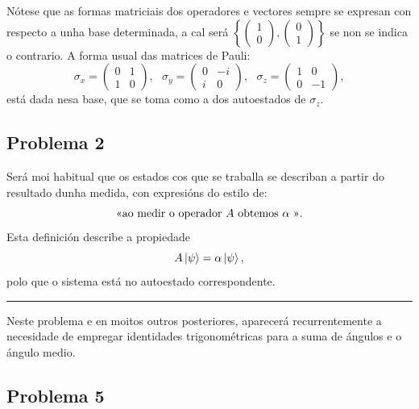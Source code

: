 \documentclass[a4paper,12pt]{article}
\begin{document}
Nótese que as formas matriciais dos operadores e vectores sempre se expresan con respecto a unha base determinada, a cal será $\left\{ \begin{pmatrix} 1 \\ 0 \end{pmatrix}, \begin{pmatrix} 0 \\ 1 \end{pmatrix} \right\}$ se non se indica o contrario. A forma usual das matrices de Pauli:
\begin{equation}
	\sigma_x = \begin{pmatrix} 0 & 1 \\ 1 & 0 \end{pmatrix},~~~ \sigma_y = \begin{pmatrix} 0 & -i \\ i & 0 \end{pmatrix},~~~ \sigma_z = \begin{pmatrix} 1 & 0 \\ 0 & -1 \end{pmatrix},
\end{equation}
\noindent
está dada nesa base, que se toma como a dos autoestados de $\sigma_z$.

\subsection*{Problema 2}

Será moi habitual que os estados cos que se traballa se describan a partir do resultado dunha medida, con expresións do estilo de:
\begin{equation*}
	\text{\guillemotleft ao medir o operador $A$ obtemos $\alpha$ \guillemotright}. 
\end{equation*}
\noindent
Esta definición describe a propiedade
\begin{equation}
	A\ket{\psi} = \alpha \ket{\psi},
\end{equation}
\noindent
polo que o sistema está no autoestado correspondente.

\begin{center} \hrule \end{center}

Neste problema e en moitos outros posteriores, aparecerá recurrentemente a necesidade de empregar identidades trigonométricas para a suma de ángulos e o ángulo medio.

\subsection*{Problema 5}
\end{document}
